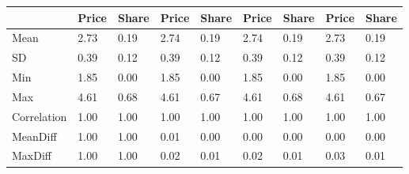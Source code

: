 \begin{table}[htbp]
\begin{tabular}{lllllllll} \hline \hline
 & Price  & Share  & Price  & Share  & Price  & Share  & Price  & Share  \\  \hline 
Mean &      2.73 &      0.19 &      2.74 &      0.19 &      2.74 &      0.19 &      2.73 &      0.19 \\  
SD &      0.39 &      0.12 &      0.39 &      0.12 &      0.39 &      0.12 &      0.39 &      0.12 \\  
Min &      1.85 &      0.00 &      1.85 &      0.00 &      1.85 &      0.00 &      1.85 &      0.00 \\  
Max &      4.61 &      0.68 &      4.61 &      0.67 &      4.61 &      0.68 &      4.61 &      0.67 \\  
Correlation &      1.00 &      1.00 &      1.00 &      1.00 &      1.00 &      1.00 &      1.00 &      1.00 \\  
MeanDiff &      1.00 &      1.00 &      0.01 &      0.00 &      0.00 &      0.00 &      0.00 &      0.00 \\  
MaxDiff &      1.00 &      1.00 &      0.02 &      0.01 &      0.02 &      0.01 &      0.03 &      0.01 \\  
\hline \hline \end{tabular}
\end{table}
